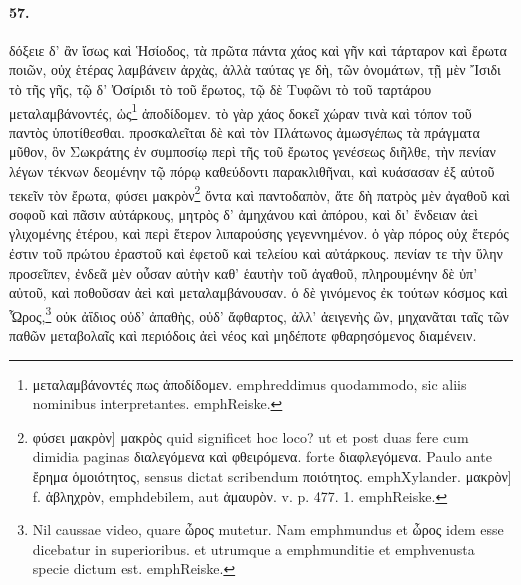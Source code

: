 \documentclass[a4paper, 11pt, oneside, polutonikogreek, german]{article}
\begin{document}
\paragraph{57.}
δόξειε δ' ἂν ἴσως καὶ Ἡσίοδος, τὰ πρῶτα πάντα χάος καὶ γῆν καὶ τάρταρον καὶ ἔρωτα ποιῶν, οὐχ ἑτέρας λαμβάνειν ἀρχὰς, ἀλλὰ ταύτας γε δὴ, τῶν ὀνομάτων, τῇ μὲν Ἴσιδι τὸ τῆς γῆς, τῷ δ' Ὀσίριδι τὸ τοῦ ἔρωτος, τῷ δὲ Τυφῶνι τὸ τοῦ ταρτάρου μεταλαμβάνοντές, ὡς\footnote{μεταλαμβάνοντές πως ἀποδίδομεν. emph{reddimus quodammodo, sic aliis nominibus interpretantes.} emph{Reiske.}} ἀποδίδομεν. τὸ γὰρ χάος δοκεῖ χώραν τινὰ καὶ τόπον τοῦ παντὸς ὑποτίθεσθαι. προσκαλεῖται δὲ καὶ τὸν Πλάτωνος ἀμωσγέπως τὰ πράγματα μῦθον, ὃν Σωκράτης ἐν συμποσίῳ περὶ τῆς τοῦ ἔρωτος γενέσεως διῆλθε, τὴν πενίαν λέγων τέκνων δεομένην τῷ πόρῳ καθεύδοντι παρακλιθῆναι, καὶ κυάσασαν ἐξ αὐτοῦ τεκεῖν τὸν ἔρωτα, φύσει μακρὸν\footnote{φύσει μακρὸν] μακρὸς quid significet hoc loco? ut et post duas fere cum dimidia paginas διαλεγόμενα καὶ φθειρόμενα. forte διαφλεγόμενα. Paulo ante ἔρημα ὁμοιότητος, sensus dictat scribendum ποιότητος. emph{Xylander.} μακρὸν] f. ἀβληχρὸν, emph{debilem}, aut ἀμαυρὸν. v. p. 477. 1. emph{Reiske.} } ὄντα καὶ παντοδαπὸν, ἅτε δὴ πατρὸς μὲν ἀγαθοῦ καὶ σοφοῦ καὶ πᾶσιν αὐτάρκους, μητρὸς δ' ἀμηχάνου καὶ ἀπόρου, καὶ δι' ἔνδειαν ἀεὶ γλιχομένης ἑτέρου, καὶ περὶ ἕτερον λιπαρούσης γεγεννημένον. ὁ γὰρ πόρος οὐχ ἕτερός ἐστιν τοῦ πρώτου ἐραστοῦ καὶ ἐφετοῦ καὶ τελείου καὶ αὐτάρκους. πενίαν τε τὴν ὕλην προσεῖπεν, ἐνδεᾶ μὲν οὖσαν αὐτὴν καθ' ἑαυτὴν τοῦ ἀγαθοῦ, πληρουμένην δὲ ὑπ' αὐτοῦ, καὶ ποθοῦσαν ἀεὶ καὶ μεταλαμβάνουσαν. ὁ δὲ γινόμενος ἐκ τούτων κόσμος καὶ Ὧρος,\footnote{Nil caussae video, quare ὦρος mutetur. Nam emph{mundus} et ὦρος idem esse dicebatur in superioribus. et utrumque a emph{munditie} et emph{venusta specie} dictum est. emph{Reiske.}} οὐκ ἀΐδιος οὐδ' ἀπαθὴς, οὐδ' ἄφθαρτος, ἀλλ' ἀειγενὴς ὢν, μηχανᾶται ταῖς τῶν παθῶν μεταβολαῖς καὶ περιόδοις ἀεὶ νέος καὶ μηδέποτε φθαρησόμενος διαμένειν.
\end{document}
